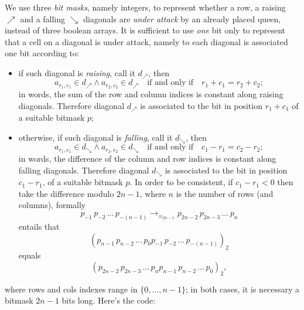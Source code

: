 We use three \textit{bit masks}, namely integers, to represent whether a row, a
raising $\nearrow$ and a falling $\searrow$ diagonals are \textit{under attack}
by an already placed queen, instead of three boolean arrays.  It is sufficient
to use \textit{one} bit only to represent that a cell on a diagonal is under
attack, namely to each diagonal is associated one bit according to:
\begin{itemize}
\item if such diagonal is \textit{raising}, call it $d_\nearrow$, then
  \begin{displaymath}
    a_{r_{1}, c_{1}}\in d_\nearrow \wedge a_{r_{2}, c_{2}} \in d_\nearrow
    \quad\text{if and only if}\quad r_{1}+c_{1}=r_{2}+c_{2};
  \end{displaymath}
  in words, the sum of the row and column indices is
  constant along raising diagonals. Therefore diagonal $d_\nearrow$ is
  associated to the bit in position $r_{1}+c_{1}$ of a suitable bitmask $p$;
\item otherwise, if such diagonal is \textit{falling}, call it $d_\searrow$, then
  \begin{displaymath}
    a_{r_{1}, c_{1}}\in d_\searrow \wedge a_{r_{2}, c_{2}} \in d_\searrow
    \quad\text{if and only if}\quad c_{1}-r_{1}=c_{2}-r_{2};
  \end{displaymath}
  in words, the difference of the column and row
  indices is constant along falling diagonals. Therefore diagonal $d_\searrow$
  is associated to the bit in position  $c_{1}-r_{1}$, of a suitable bitmask $p$.
  In order to be consistent, if $c_{1}-r_{1} < 0$ then take the difference modulo
  $2n-1$, where $n$ is the number of rows (and columns), formally
  \begin{displaymath}
  p_{-1}\,p_{-2}\,\ldots\,p_{-(n-1)} \rightarrow_{\equiv_{2n-1}}
  p_{2n-2}\,p_{2n-3}\,\ldots\,p_{n}
  \end{displaymath}
  entails that
  \begin{displaymath}
  \left(p_{n-1}\,p_{n-2}\,\ldots\,p_{0}p_{-1}\,p_{-2}\,\ldots\,p_{-(n-1)}\right)_{2}
  \end{displaymath}
  equals
  \begin{displaymath}
  \left(p_{2n-2}\,p_{2n-3}\,\ldots\,p_{n}p_{n-1}\,p_{n-2}\,\ldots\,p_{0}\right)_{2},
  \end{displaymath}
\end{itemize}
where rows and cols indexes range in $\lbrace 0,\ldots,n-1 \rbrace$; in both
cases, it is necessary a bitmask $2n-1$ bits long. Here's the code:

